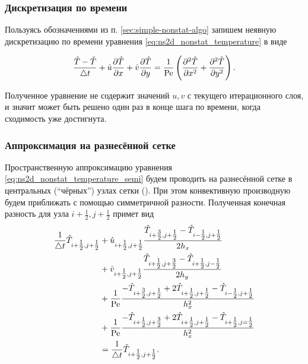 \subsubsection{Дискретизация по времени}

Пользуясь обозначениями из п. \ref{sec:simple-nonstat-algo}
запишем неявную дискретизацию по времени уравнения \cref{eq:ns2d_nonstat_temperature} в виде

\begin{equation}
\label{eq:ns2d_nonstat_temperature_semi}
\frac{\hat T - \check T}{\triangle t} + \hat u\frac{\partial \hat T}{\partial x} + \hat v\frac{\partial \hat T}{\partial y} = \frac{1}{\mathrm{Pe}}\left(\frac{\partial^2 \hat T}{\partial x^2} + \frac{\partial^2 \hat T}{\partial y^2}\right).
\end{equation}

Полученное уравнение не содержит значений $u, v$ с текущего итерационного слоя,
и значит может быть решено один раз в конце шага по времени, когда сходимость уже достигнута.

\subsubsection{Аппроксимация на разнесённой сетке}

Пространственную аппроксимацию уравнения \cref{eq:ns2d_nonstat_temperature_semi}
будем проводить на разнесённой сетке в центральных (``чёрных'') узлах сетки ().
При этом конвективную производную будем приближать с помощью симметричной разности.
Полученная конечная разность для узла $i+\tfrac12, j+\tfrac12$ примет вид
\begin{align}
\label{eq:ns2d_nonstat_temperature_scheme}
\frac{1}{\triangle t}\hat T_{i+\tfrac12,j+\tfrac12}
    & + \hat u_{i+\tfrac12, j+\tfrac12}\frac{\hat T_{i+\tfrac32, j+\tfrac12} - \hat T_{i-\tfrac12, j+\tfrac12}}{2h_x}\\
    \nonumber
    & + \hat v_{i+\tfrac12, j+\tfrac12}\frac{\hat T_{i+\tfrac12, j+\tfrac32} - \hat T_{i+\tfrac12, j-\tfrac12}}{2h_y}\\
    \nonumber
    & + \frac{1}{\mathrm{Pe}} \frac{-\hat T_{i+\tfrac32, j+\tfrac12} + 2\hat T_{i+\tfrac12,j+\tfrac12} - \hat T_{i-\tfrac12, j+\tfrac12}}{h_x^2} \\
    \nonumber
    & + \frac{1}{\mathrm{Pe}} \frac{-\hat T_{i+\tfrac12, j+\tfrac32} + 2\hat T_{i+\tfrac12,j+\tfrac12} - \hat T_{i+\tfrac12, j=\tfrac12}}{h_x^2} \\
    \nonumber
    & = \frac{1}{\triangle t}\check T_{i+\tfrac12,j+\tfrac12}.
\end{align}

